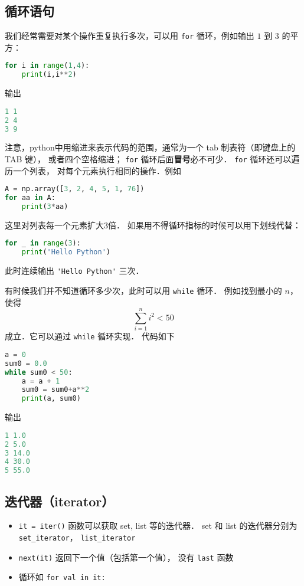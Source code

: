 \subsection{循环语句}
我们经常需要对某个操作重复执行多次，可以用 \verb|for| 循环，例如输出 $1$ 到 $3$ 的平方：
\begin{lstlisting}[language=python]
for i in range(1,4):
    print(i,i**2)
\end{lstlisting}
输出
\begin{lstlisting}[language=python]
1 1
2 4
3 9
\end{lstlisting}
注意，python中用缩进来表示代码的范围，通常为一个 tab 制表符（即键盘上的 TAB 键）， 或者四个空格缩进； \verb|for| 循环后面\textbf{冒号}必不可少． \verb|for| 循环还可以遍历一个列表， 对每个元素执行相同的操作．例如
\begin{lstlisting}[language=python]
A = np.array([3, 2, 4, 5, 1, 76])
for aa in A:
    print(3*aa)
\end{lstlisting}
这里对列表每一个元素扩大3倍． 如果用不得循环指标的时候可以用下划线代替：
\begin{lstlisting}[language=python]
for _ in range(3):
    print('Hello Python')
\end{lstlisting}
此时连续输出   \verb|'Hello Python'|  三次．

有时候我们并不知道循环多少次，此时可以用 \verb|while| 循环． 例如找到最小的 $n$，使得
\begin{equation}
\sum_{i=1}^n i^2<50
\end{equation}
成立．它可以通过 \verb|while| 循环实现． 代码如下
\begin{lstlisting}[language=python]
a = 0
sum0 = 0.0
while sum0 < 50:
    a = a + 1
    sum0 = sum0+a**2
    print(a, sum0)
\end{lstlisting}
输出
\begin{lstlisting}[language=python]
1 1.0
2 5.0
3 14.0
4 30.0
5 55.0
\end{lstlisting}

\subsection{迭代器（iterator）}
\begin{itemize}
\item \verb|it = iter()| 函数可以获取 set, list 等的迭代器． set 和 list 的迭代器分别为 \verb|set_iterator|， \verb|list_iterator|
\item \verb|next(it)| 返回下一个值（包括第一个值）， 没有 \verb|last| 函数
\item 循环如 \verb|for val in it:|
\end{itemize}
